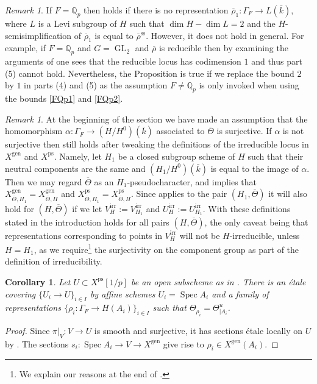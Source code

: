 \documentclass{amsart}
\newtheorem{cor}[prop]{Corollary}
\theoremstyle{definition}
\theoremstyle{remark}
\newtheorem{remar}[prop]{Remark}
\DeclareMathOperator{\GL}{GL}
\DeclareMathOperator{\Spec}{Spec}
\newcommand{\Qp}{\mathbb {Q}_p}
\newcommand{\rhobar}{\overline{\rho}}
\newcommand{\gen}{\mathrm{gen}}
\newcommand{\irr}{\mathrm{irr}}
\newcommand{\kbar}{\bar{k}}
\newcommand{\Thetabar}{\overline{\Theta}}
\newcommand{\ps}{\mathrm{ps}}
\begin{document}
\begin{remar} If $F=\Qp$ then   holds if there is no representation $\rhobar_1: \Gamma_F\rightarrow L(\kbar)$, 
where $L$ is a 
Levi subgroup of $H$ 
such that $\dim H -\dim L=2$ and 
the $H$-semisimplification of $\rhobar_1$ is equal to $\rhobar^{\mathrm{ss}}$.
However, it does not 
hold in general. For example,
if $F=\Qp$ and $G=\GL_2$ and $\rhobar$ is reducible then by examining the arguments of \cite[Lemma 3.29]{BIP_new} one sees that the
reducible locus has codimension $1$
and thus part (5) cannot hold. Nevertheless, the Proposition 
is true if we replace the bound $2$ by $1$ in parts (4) and (5) as the assumption $F\neq \Qp$ is only invoked
when using the bounds \eqref{FQp1} and \eqref{FQp2}.
\end{remar}

\begin{remar}
\label{much_ado} At the beginning of the section we have 
made an assumption that the homomorphism $\alpha:\Gamma_F\rightarrow (H/H^0)(\kbar)$ associated to $\Thetabar$ is surjective. If $\alpha$ is not surjective
then  still holds after tweaking the definitions of the irreducible locus in $X^{\gen}$ and $X^{\ps}$. Namely, let $H_1$ be a closed subgroup scheme of $H$ such that their neutral components are the same and $(H_1/H^0)(\kbar)$ is equal to the image of $\alpha$. Then we may regard $\Thetabar$ as an $H_1$-pseudocharacter, and \cite[Lemma 9.2]{defG} implies that $X^{\gen}_{\Thetabar, H_1} = X^{\gen}_{\Thetabar, H}$ and $X^{\ps}_{\Thetabar, H_1}= X^{\ps}_{\Thetabar, H}$. Since  applies to the pair $(H_1, \Thetabar)$ it will also hold for $(H, \Thetabar)$ if we let $V^{\irr}_H:= V^{\irr}_{H_1}$ and $U^{\irr}_H:= U^{\irr}_{H_1}$. With these definitions  stated 
in the introduction holds for all pairs 
$(H, \Thetabar)$, the only caveat being that representations corresponding to points in $V^{\irr}_H$ will not be $H$-irreducible, unless $H=H_1$, as we require\footnote{We explain our reasons at the end of \cite[\S 9]{defG}.} the surjectivity on the component group as part of the definition of irreducibility.
\end{remar} 

\begin{cor}\label{cover_nice_locus} Let $U\subset X^{\ps}[1/p]$ be 
an open subscheme as in . There
is an \'etale covering $\{U_i\rightarrow U\}_{i\in I}$ by affine schemes 
$U_i=\Spec A_i$ and a family of representations $\{\rho_i: \Gamma_F \rightarrow H(A_i)\}_{i\in I}$ such that 
$\Theta_{\rho_i}= \Theta^u_{|A_i}$. 
\end{cor}
\begin{proof} Since $\pi|_V: V\rightarrow U$
is smooth and surjective, it has sections \'etale locally on $U$ by \cite[Corollaire 17.16.3 (ii)]{EGA4_4}. The sections 
$s_i: \Spec A_i \rightarrow V \rightarrow X^{\gen}$ give rise to $\rho_i\in X^{\gen}(A_i)$.
\end{proof}
\end{document}

